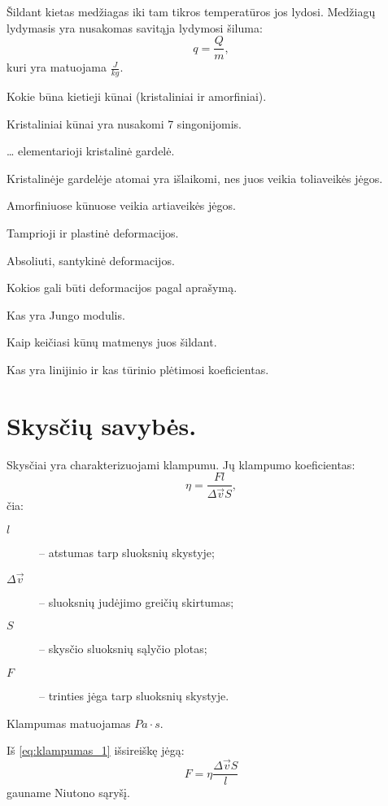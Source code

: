 Šildant kietas medžiagas iki tam tikros temperatūros jos lydosi.
Medžiagų lydymasis yra nusakomas savitąja lydymosi šiluma:
\begin{equation*}
  q = \frac{Q}{m},
\end{equation*}
kuri yra matuojama $\frac{J}{kg}$.

\begin{remember}
  \item Kokie būna kietieji kūnai (kristaliniai ir amorfiniai).
  \item Kristaliniai kūnai yra nusakomi 7 singonijomis.
  \item … elementarioji kristalinė gardelė.
  \item Kristalinėje gardelėje atomai yra išlaikomi, nes juos veikia
    toliaveikės jėgos.
  \item Amorfiniuose kūnuose veikia artiaveikės jėgos.
  \item Tamprioji ir plastinė deformacijos.
  \item Absoliuti, santykinė deformacijos.
  \item Kokios gali būti deformacijos pagal aprašymą.
  \item Kas yra Jungo modulis.
  \item Kaip keičiasi kūnų matmenys juos šildant.
  \item Kas yra linijinio ir kas tūrinio plėtimosi koeficientas.
\end{remember}

\section{Skysčių savybės.}

Skysčiai yra charakterizuojami klampumu. Jų klampumo koeficientas:
\begin{equation}
  \eta = \frac{Fl}{\Delta \vec{v}S},
  \label{eq:klampumas_1}
\end{equation}
čia:
\begin{description}
  \item[$l$] – atstumas tarp sluoksnių skystyje;
  \item[$\Delta \vec{v}$] – sluoksnių judėjimo greičių skirtumas;
  \item[$S$] – skysčio sluoksnių sąlyčio plotas;
  \item[$F$] – trinties jėga tarp sluoksnių skystyje.
\end{description}
Klampumas matuojamas $Pa \cdot s$.

Iš \ref{eq:klampumas_1} išsireiškę jėgą:
\begin{equation*}
  F = \eta \frac{\Delta \vec{v} S}{l}
\end{equation*}
gauname Niutono sąryšį.

